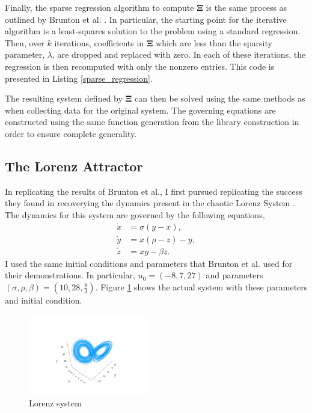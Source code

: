 \documentclass[10pt]{paper}
\begin{document}
Finally, the sparse regression algorithm to compute $\mathbf \Xi$ is the same process as outlined by Brunton et al. \cite{sindy}. In particular, the starting point for the iterative algorithm is a least-squares solution to the problem using a standard regression. Then, over $k$ iterations, coefficients in $\mathbf \Xi$ which are less than the sparsity parameter, $\lambda$, are dropped and replaced with zero. In each of these iterations, the regression is then recomputed with only the nonzero entries. 
This code is presented in Listing \ref{sparse_regression}.


The resulting system defined by $\mathbf \Xi$ can then be solved using the same methods as when collecting data for the original system. The governing equations are constructed using the same function generation from the library construction in order to ensure complete generality. 


\subsection{The Lorenz Attractor} \label{sec:lorenz_results}
In replicating the results of Brunton et al., I first pursued replicating the success they found in recoverying the dynamics present in the chaotic Lorenz System \cite{sindy}\cite{lorenz1963deterministic}. 
The dynamics for this system are governed by the following equations, 
\begin{equation}\label{eq:lorenz}
\begin{split}
	\dot x &= \sigma(y - x), \\
	\dot y &= x(\rho - z) - y, \\
	\dot z &= xy - \beta z.
\end{split}
\end{equation}
I used the same initial conditions and parameters that Brunton et al. \cite{sindy} used for their demonstrations. In particular, $u_0 = (-8, 7, 27)$ and parameters $(\sigma, \rho, \beta) = \left( 10, 28, \frac 83 \right)$. 
Figure \ref{fig:lorenz_system_actual} shows the actual system with these parameters and initial condition. 

\begin{figure}[h]
	\caption{Lorenz system}
	\label{fig:lorenz_system_actual}

	\centering
	\includegraphics[width = 0.47\textwidth, trim={4.3cm, 1.9cm, 4.3cm, 3.5cm}, clip]{lorenz_actual_graph.png}
\end{figure}
\end{document}
